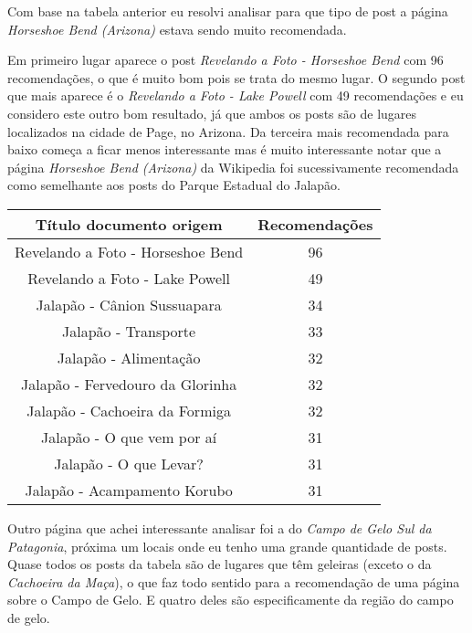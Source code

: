 Com base na tabela anterior eu resolvi analisar para que tipo de post a página \textit{Horseshoe Bend (Arizona)} estava sendo muito recomendada.

Em primeiro lugar aparece o post \textit{Revelando a Foto - Horseshoe Bend} com 96 recomendações, o que é muito bom pois se trata do mesmo lugar.
O segundo post que mais aparece é o \textit{Revelando a Foto - Lake Powell} com 49 recomendações e eu considero este outro bom resultado, já que ambos
os posts são de lugares localizados na cidade de Page, no Arizona. Da terceira mais recomendada para baixo começa a ficar menos interessante mas 
é muito interessante notar que a página \textit{Horseshoe Bend (Arizona)} da Wikipedia foi sucessivamente recomendada como semelhante aos posts 
do Parque Estadual do Jalapão.

\begin{center}
    \begin{tabular}{|c|c|}
        \hline
        \textbf{Título documento origem} & \textbf{Recomendações} \\
        \hline
        Revelando a Foto - Horseshoe Bend & 96 \\
        \hline
        Revelando a Foto - Lake Powell & 49 \\
        \hline
        Jalapão - Cânion Sussuapara & 34 \\
        \hline
        Jalapão - Transporte & 33 \\
        \hline
        Jalapão - Alimentação & 32 \\
        \hline
        Jalapão - Fervedouro da Glorinha & 32 \\
        \hline
        Jalapão - Cachoeira da Formiga & 32 \\
        \hline
        Jalapão - O que vem por aí & 31 \\
        \hline
        Jalapão - O que Levar? & 31 \\
        \hline
        Jalapão - Acampamento Korubo & 31 \\
        \hline
    \end{tabular}
\end{center}

Outro página que achei interessante analisar foi a do \textit{Campo de Gelo Sul da Patagonia}, próxima um locais onde eu tenho 
uma grande quantidade de posts. Quase todos os posts da tabela são de lugares que têm geleiras (exceto o da \textit{Cachoeira da Maça}), 
o que faz todo sentido para a recomendação de uma página sobre o Campo de Gelo. E quatro deles são especificamente da região do campo de gelo.

